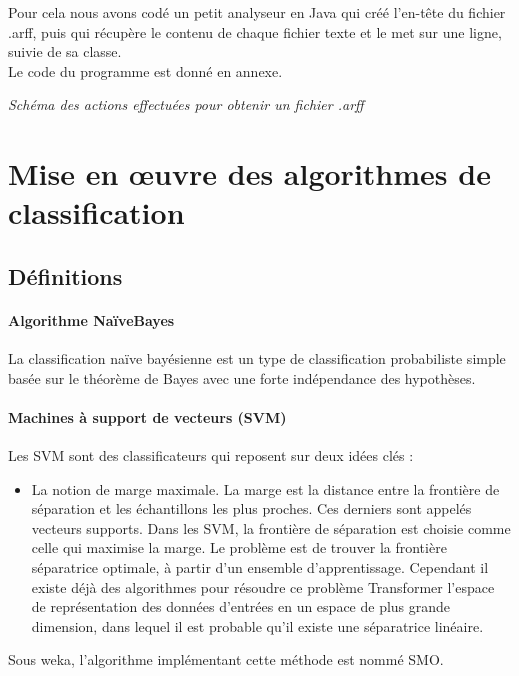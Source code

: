 \documentclass[a4paper,11pt]{article}
\begin{document}
Pour cela nous avons codé un petit analyseur en Java qui créé l’en-tête du fichier .arff, puis qui récupère le contenu de chaque fichier texte et le met sur une ligne, suivie de sa classe.\\Le code du programme est donné en annexe.
\vspace{1.5cm}

\noindent
{}
\begin{center}
\textit{Schéma des actions effectuées pour obtenir un fichier .arff}
\end{center}

\newpage
\section{Mise en œuvre des algorithmes de classification}
\subsection{Définitions}
\paragraph{Algorithme NaïveBayes}
La classification naïve bayésienne est un type de classification probabiliste simple basée sur le théorème de Bayes avec une forte indépendance des hypothèses.

\paragraph{Machines à support de vecteurs (SVM)}
Les SVM sont des classificateurs qui reposent sur deux idées clés :
\begin{itemize}
\item La notion de marge maximale. La marge est la distance entre la frontière de séparation et les échantillons les plus proches. Ces derniers sont appelés vecteurs supports. Dans les SVM, la frontière de séparation est choisie comme celle qui maximise la marge. Le problème est de trouver la frontière séparatrice optimale, à partir d’un ensemble d’apprentissage. Cependant il existe déjà des algorithmes pour résoudre ce problème
Transformer l’espace de représentation des données d’entrées en un espace de plus grande dimension, dans lequel il est probable qu’il existe une séparatrice linéaire.
\end{itemize}
Sous weka, l’algorithme implémentant cette méthode est nommé SMO.
\end{document}
